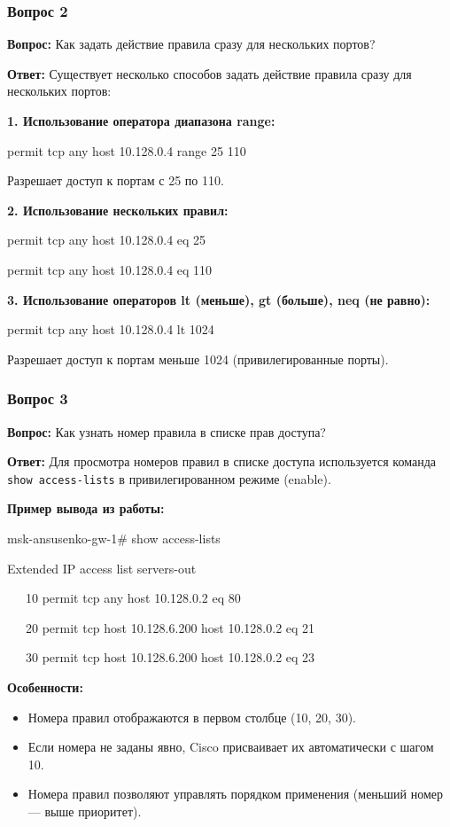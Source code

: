 \begin{frame}
\frametitle{Вопрос 2}
\parbox{\textwidth}{
\textbf{Вопрос:} Как задать действие правила сразу для нескольких портов?

\textbf{Ответ:} Существует несколько способов задать действие правила сразу для нескольких портов:

\textbf{1. Использование оператора диапазона range:}

\ttfamily permit tcp any host 10.128.0.4 range 25 110

Разрешает доступ к портам с 25 по 110.

\textbf{2. Использование нескольких правил:}

\ttfamily permit tcp any host 10.128.0.4 eq 25

\ttfamily permit tcp any host 10.128.0.4 eq 110

\textbf{3. Использование операторов lt (меньше), gt (больше), neq (не равно):}

\ttfamily permit tcp any host 10.128.0.4 lt 1024

Разрешает доступ к портам меньше 1024 (привилегированные порты).
}
\end{frame}

\begin{frame}
\frametitle{Вопрос 3}
\parbox{\textwidth}{
\textbf{Вопрос:} Как узнать номер правила в списке прав доступа?

\textbf{Ответ:} Для просмотра номеров правил в списке доступа используется команда \texttt{show access-lists} в привилегированном режиме (enable).

\textbf{Пример вывода из работы:}

\ttfamily msk-ansusenko-gw-1\# show access-lists

\ttfamily Extended IP access list servers-out

\ttfamily \ \ \ 10 permit tcp any host 10.128.0.2 eq 80

\ttfamily \ \ \ 20 permit tcp host 10.128.6.200 host 10.128.0.2 eq 21

\ttfamily \ \ \ 30 permit tcp host 10.128.6.200 host 10.128.0.2 eq 23

\textbf{Особенности:}
\begin{itemize}
    \item Номера правил отображаются в первом столбце (10, 20, 30).
    \item Если номера не заданы явно, Cisco присваивает их автоматически с шагом 10.
    \item Номера правил позволяют управлять порядком применения (меньший номер --- выше приоритет).
\end{itemize}
}
\end{frame}

